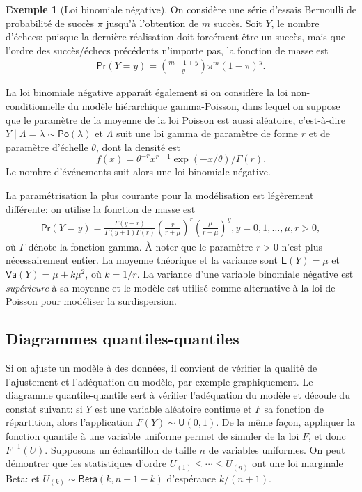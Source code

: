 \documentclass[
  11pt,
  letterpaper,
]{book}
\theoremstyle{definition}
\theoremstyle{definition}
\newtheorem{example}{Exemple}[chapter]
\theoremstyle{definition}
\theoremstyle{remark}
\begin{document}
\begin{example}[Loi binomiale négative]
\protect\hypertarget{exm:loibinneg}{}{\label{exm:loibinneg} {} }On considère une série d'essais Bernoulli de probabilité de succès \(\pi\) jusqu'à l'obtention de \(m\) succès. Soit \(Y\), le nombre d'échecs: puisque la dernière réalisation doit forcément être un succès, mais que l'ordre des succès/échecs précédents n'importe pas, la fonction de masse est
\begin{align*}
\mathsf{Pr}(Y=y)= \binom{m-1+y}{y} \pi^m (1-\pi)^{y}.
\end{align*}

La loi binomiale négative apparaît également si on considère la loi non-conditionnelle du modèle hiérarchique gamma-Poisson, dans lequel on suppose que le paramètre de la moyenne de la loi Poisson est aussi aléatoire, c'est-à-dire \(Y \mid \Lambda=\lambda \sim \mathsf{Po}(\lambda)\) et \(\Lambda\) suit une loi gamma de paramètre de forme \(r\) et de paramètre d'échelle \(\theta\), dont la densité est \[f(x) = \theta^{-r}x^{r-1}\exp(-x/\theta)/\Gamma(r).\] Le nombre d'événements suit alors une loi binomiale négative.

La paramétrisation la plus courante pour la modélisation est légèrement différente: on utilise la fonction de masse est
\begin{align*}
\mathsf{Pr}(Y=y)=\frac{\Gamma(y+r)}{\Gamma(y+1)\Gamma(r)} \left(\frac{r}{r + \mu} \right)^{r} \left(\frac{\mu}{r+\mu}\right)^y, y=0, 1, \ldots, \mu,r >0,
\end{align*}
où \(\Gamma\) dénote la fonction gamma. À noter que le paramètre \(r>0\) n'est plus nécessairement entier. La moyenne théorique et la variance sont
\(\mathsf{E}(Y)=\mu\) et \(\mathsf{Va}(Y)=\mu+k\mu^2\), où \(k=1/r\). La variance d'une variable binomiale négative est \emph{supérieure} à sa moyenne et le modèle est utilisé comme alternative à la loi de Poisson pour modéliser la surdispersion.
\end{example}

\hypertarget{diagramme-qq}{%
\subsection{Diagrammes quantiles-quantiles}\label{diagramme-qq}}

Si on ajuste un modèle à des données, il convient de vérifier la qualité de l'ajustement et l'adéquation du modèle, par exemple graphiquement. Le diagramme quantile-quantile sert à vérifier l'adéquation du modèle et découle du constat suivant: si \(Y\) est une variable aléatoire continue et \(F\) sa fonction de répartition, alors l'application \(F(Y) \sim \mathsf{U}(0,1)\). De la même façon, appliquer la fonction quantile à une variable uniforme permet de simuler de la loi \(F\), et donc \(F^{-1}(U)\). Supposons un échantillon de taille \(n\) de variables uniformes. On peut démontrer que les statistiques d'ordre \(U_{(1)} \leq \cdots \leq U_{(n)}\) ont une loi marginale Beta: et \(U_{(k)} \sim \mathsf{Beta}(k, n+1-k)\) d'espérance \(k/(n+1)\).
\end{document}
